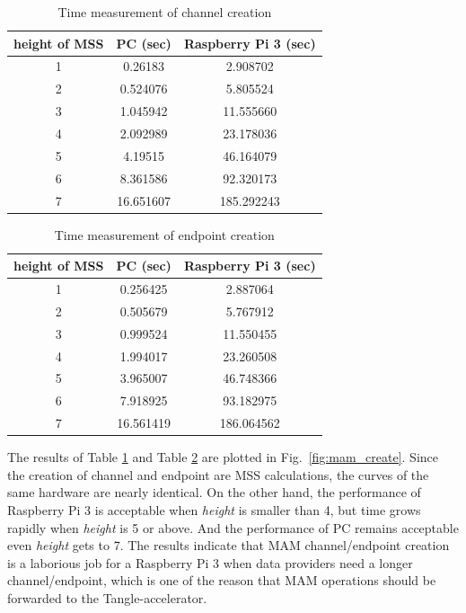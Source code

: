 \begin{spacing}{2.0}
\begin{table}[htbp]
	\caption{Time measurement of channel creation}
	\label{tab:channel_create}
	\begin{center}
	\begin{tabular}{|c|c|c|}
	\hline
		\textbf{height of MSS} & \textbf{PC (sec)} & \textbf{Raspberry Pi 3 (sec)} \\ 
		\hline
		1 & 0.26183 & 2.908702 \\ 
		2 & 0.524076 & 5.805524 \\ 
		3 & 1.045942 & 11.555660 \\ 
		4 & 2.092989 & 23.178036 \\ 
		5 & 4.19515 & 46.164079\\ 
		6 & 8.361586 & 92.320173\\ 
		7 & 16.651607 & 185.292243\\
		\hline
	\end{tabular}
	\end{center}
\end{table}

\begin{table}[htbp]
	\caption{Time measurement of endpoint creation}
	\label{tab:endpoint_create}
	\begin{center}
	\begin{tabular}{|c|c|c|}
	\hline
		\textbf{height of MSS} & \textbf{PC (sec)} & \textbf{Raspberry Pi 3 (sec)} \\ 
		\hline
		1 & 0.256425 & 2.887064 \\ 
		2 & 0.505679 & 5.767912 \\ 
		3 & 0.999524 & 11.550455 \\ 
		4 & 1.994017 & 23.260508 \\ 
		5 & 3.965007 & 46.748366 \\ 
		6 & 7.918925 & 93.182975 \\ 
		7 & 16.561419 & 186.064562 \\
		\hline
	\end{tabular}
	\end{center}
\end{table}

The results of Table \ref{tab:channel_create} and Table \ref{tab:endpoint_create} are plotted in Fig.~\ref{fig:mam_create}. Since the creation of channel and endpoint are MSS calculations, the curves of the same hardware are nearly identical. On the other hand, the performance of Raspberry Pi 3 is acceptable when \textit{height} is smaller than 4, but time grows rapidly when \textit{height} is 5 or above. And the performance of PC remains acceptable even \textit{height} gets to 7. The results indicate that MAM channel/endpoint creation is a laborious job for a Raspberry Pi 3 when data providers need a longer channel/endpoint, which is one of the reason that MAM operations should be forwarded to the Tangle-accelerator.


\end{spacing}
